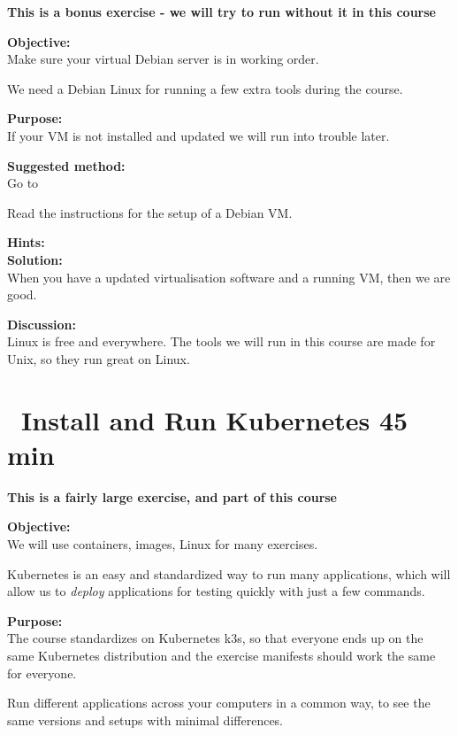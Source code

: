 \documentclass[a4paper,11pt,notitlepage]{report}
\begin{document}

{\Large \bf This is a bonus exercise - we will try to run without it in this course}

{\bf Objective:}\\
Make sure your virtual Debian server is in working order.

We need a Debian Linux for running a few extra tools during the course.


{\bf Purpose:}\\
If your VM is not installed and updated we will run into trouble later.

{\bf Suggested method:}\\
Go to 

Read the instructions for the setup of a Debian VM.

{\bf Hints:}\\

{\bf Solution:}\\
When you have a updated virtualisation software and a running VM, then we are good.

{\bf Discussion:}\\
Linux is free and everywhere. The tools we will run in this course are made for Unix, so they run great on Linux.




\chapter{\faExclamationTriangle\ Install and Run Kubernetes 45 min}
\label{ex:sw-kubernetes}


{\Large \bf This is a fairly large exercise, and part of this course}

{\bf Objective:}\\
We will use containers, images, Linux for many exercises.

Kubernetes is an easy and standardized way to run many applications, which will allow us to \emph{deploy} applications for testing quickly with just a few commands.

{\bf Purpose:}\\
The course standardizes on Kubernetes k3s, so that everyone ends up on the same Kubernetes distribution and the exercise manifests should work the same for everyone.

Run different applications across your computers in a common way, to see the same versions and setups with minimal differences.
\end{document}
